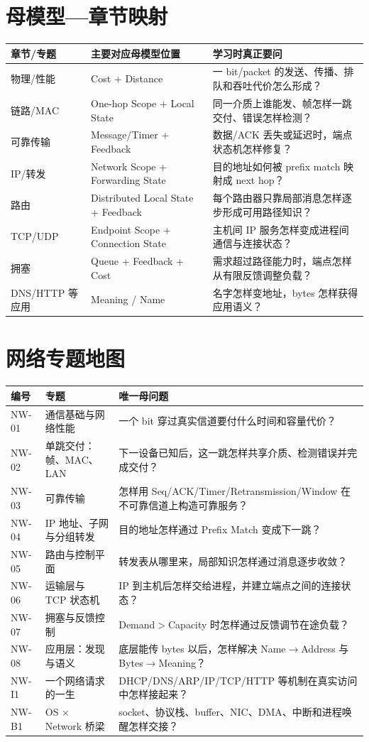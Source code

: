 \documentclass[11pt,a4paper,openany]{ctexbook}
\begin{document}
\section{母模型—章节映射}
\begin{longtable}{L{3.0cm}L{4.25cm}L{\dimexpr\linewidth-8.52cm\relax}}
\toprule
\textbf{章节/专题} & \textbf{主要对应母模型位置} & \textbf{学习时真正要问}\\
\midrule
物理/性能 & Cost + Distance & 一 bit/packet 的发送、传播、排队和吞吐代价怎么形成？\\
链路/MAC & One-hop Scope + Local State & 同一介质上谁能发、帧怎样一跳交付、错误怎样检测？\\
可靠传输 & Message/Timer + Feedback & 数据/ACK 丢失或延迟时，端点状态机怎样修复？\\
IP/转发 & Network Scope + Forwarding State & 目的地址如何被 prefix match 映射成 next hop？\\
路由 & Distributed Local State + Feedback & 每个路由器只靠局部消息怎样逐步形成可用路径知识？\\
TCP/UDP & Endpoint Scope + Connection State & 主机间 IP 服务怎样变成进程间通信与连接状态？\\
拥塞 & Queue + Feedback + Cost & 需求超过路径能力时，端点怎样从有限反馈调整负载？\\
DNS/HTTP 等应用 & Meaning / Name & 名字怎样变地址，bytes 怎样获得应用语义？\\
\bottomrule
\end{longtable}

\section{网络专题地图}
\begin{longtable}{L{1.45cm}L{4.45cm}L{\dimexpr\linewidth-7.17cm\relax}}
\toprule
\textbf{编号} & \textbf{专题} & \textbf{唯一母问题}\\
\midrule
NW-01 & 通信基础与网络性能 & 一个 bit 穿过真实信道要付什么时间和容量代价？\\
NW-02 & 单跳交付：帧、MAC、LAN & 下一设备已知后，这一跳怎样共享介质、检测错误并完成交付？\\
NW-03 & 可靠传输 & 怎样用 Seq/ACK/Timer/Retransmission/Window 在不可靠信道上构造可靠服务？\\
NW-04 & IP 地址、子网与分组转发 & 目的地址怎样通过 Prefix Match 变成下一跳？\\
NW-05 & 路由与控制平面 & 转发表从哪里来，局部知识怎样通过消息逐步收敛？\\
NW-06 & 运输层与 TCP 状态机 & IP 到主机后怎样交给进程，并建立端点之间的连接状态？\\
NW-07 & 拥塞与反馈控制 & Demand$>$Capacity 时怎样通过反馈调节在途负载？\\
NW-08 & 应用层：发现与语义 & 底层能传 bytes 以后，怎样解决 Name$\to$Address 与 Bytes$\to$Meaning？\\
NW-I1 & 一个网络请求的一生 & DHCP/DNS/ARP/IP/TCP/HTTP 等机制在真实访问中怎样接起来？\\
NW-B1 & OS $\times$ Network 桥梁 & socket、协议栈、buffer、NIC、DMA、中断和进程唤醒怎样交接？\\
\bottomrule
\end{longtable}
\end{document}
